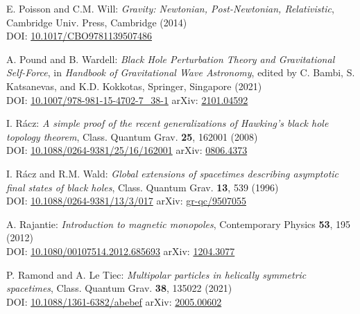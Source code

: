 \begin{thebibliography}{123}
E. Poisson and C.M. Will: {\em Gravity: Newtonian, Post-Newtonian, Relativistic},
Cambridge Univ. Press, Cambridge (2014) \\
DOI: \href{https://doi.org/10.1017/CBO9781139507486}{10.1017/CBO9781139507486}

A. Pound and B. Wardell:
{\em Black Hole Perturbation Theory and Gravitational Self-Force},
in {\em Handbook of Gravitational Wave Astronomy}, edited by
C. Bambi, S. Katsanevas, and K.D. Kokkotas,
Springer, Singapore (2021)\\
DOI: \href{https://doi.org/10.1007/978-981-15-4702-7_38-1}{10.1007/978-981-15-4702-7\_38-1}\hfill
arXiv: \href{https://arxiv.org/abs/2101.04592}{2101.04592}

I. R\'acz:
{\em A simple proof of the recent generalizations of Hawking's black hole topology theorem},
Class. Quantum Grav. {\bf 25}, 162001 (2008)\\
DOI: \href{https://doi.org/10.1088/0264-9381/25/16/162001}{10.1088/0264-9381/25/16/162001}\hfill
arXiv: \href{https://arxiv.org/abs/0806.4373}{0806.4373}

I. R\'acz and R.M. Wald:
{\em Global extensions of spacetimes describing asymptotic final states of black holes},
Class. Quantum Grav. {\bf 13}, 539 (1996)\\
DOI: \href{https://doi.org/10.1088/0264-9381/13/3/017}{10.1088/0264-9381/13/3/017}\hfill
arXiv: \href{https://arxiv.org/abs/gr-qc/9507055}{gr-qc/9507055}

A. Rajantie:
{\em Introduction to magnetic monopoles},
Contemporary Physics {\bf 53}, 195 (2012)\\
DOI: \href{https://doi.org/10.1080/00107514.2012.685693}{10.1080/00107514.2012.685693}\hfill
arXiv: \href{https://arxiv.org/abs/1204.3077}{1204.3077}

P. Ramond and A. Le Tiec:
{\em Multipolar particles in helically symmetric spacetimes},
Class. Quantum Grav. {\bf 38}, 135022 (2021)\\
DOI: \href{https://doi.org/10.1088/1361-6382/abebef}{10.1088/1361-6382/abebef}\hfill
arXiv: \href{https://arxiv.org/abs/2005.00602}{2005.00602}


\end{thebibliography}
